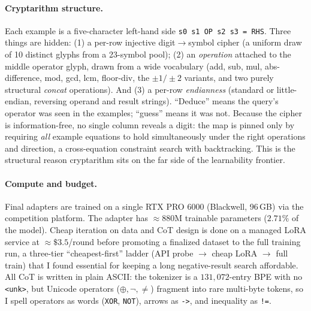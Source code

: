 \documentclass[11pt]{article}
\begin{document}
\paragraph{Cryptarithm structure.} Each example is a five-character left-hand side
\texttt{s0 s1 OP s2 s3 = RHS}. Three things are hidden: (1) a per-row injective
digit$\to$symbol cipher (a uniform draw of 10 distinct glyphs from a 23-symbol pool);
(2) an \emph{operation} attached to the middle operator glyph, drawn from a wide vocabulary
(add, sub, mul, abs-difference, mod, gcd, lcm, floor-div, the $\pm1/\pm2$ variants, and
two purely structural \emph{concat} operations). And (3) a per-row \emph{endianness}
(standard or little-endian, reversing operand and result strings). ``Deduce'' means the
query's operator was seen in the examples; ``guess'' means it was not. Because the cipher
is information-free, no single column reveals a digit: the map is pinned only by requiring
\emph{all} example equations to hold simultaneously under the right operations and
direction, a cross-equation constraint search with backtracking. This is the structural
reason cryptarithm sits on the far side of the learnability frontier.

\paragraph{Compute and budget.} Final adapters are trained on a single RTX PRO 6000
(Blackwell, 96\,GB) via the competition platform. The adapter has $\approx\!880$M trainable
parameters ($2.71\%$ of the model). Cheap iteration on data and CoT design is done on a
managed LoRA service at $\approx\!\$3.5$/round before promoting a finalized dataset to the
full training run, a three-tier ``cheapest-first'' ladder (API probe $\to$ cheap LoRA
$\to$ full train) that I found essential for keeping a long negative-result search
affordable. All CoT is written in plain ASCII: the tokenizer is a $131{,}072$-entry BPE
with no \texttt{<unk>}, but Unicode operators ($\oplus,\neg,\neq$) fragment into rare
multi-byte tokens, so I spell operators as words (\texttt{XOR}, \texttt{NOT}),
arrows as \verb|->|, and inequality as \verb|!=|.
\end{document}
